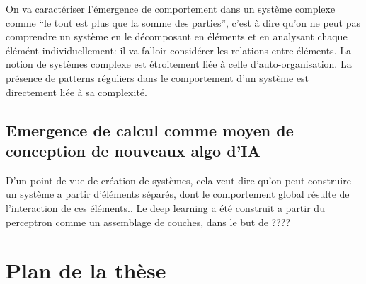 \documentclass[../main]{subfiles}
\begin{document}
On va caractériser l'émergence de comportement dans un système complexe comme “le tout est plus que la somme des parties”, c'est à dire qu'on ne peut pas comprendre un système en le décomposant en éléments et en analysant chaque élémént individuellement: il va falloir considérer les relations entre éléments. 
La notion de systèmes complexe est étroitement liée à celle d'auto-organisation. La présence de patterns réguliers dans le comportement d'un système est directement liée à sa complexité.

\subsection*{Emergence de calcul comme moyen de conception de nouveaux algo d'IA}

D'un point de vue de création de systèmes, cela veut dire qu'on peut construire un système a partir d’éléments séparés, dont le comportement global résulte de l'interaction de ces éléments..
Le deep learning a été construit a partir du perceptron comme un assemblage de couches, dans le but de ????



\section*{ Plan de la thèse}
\end{document}
